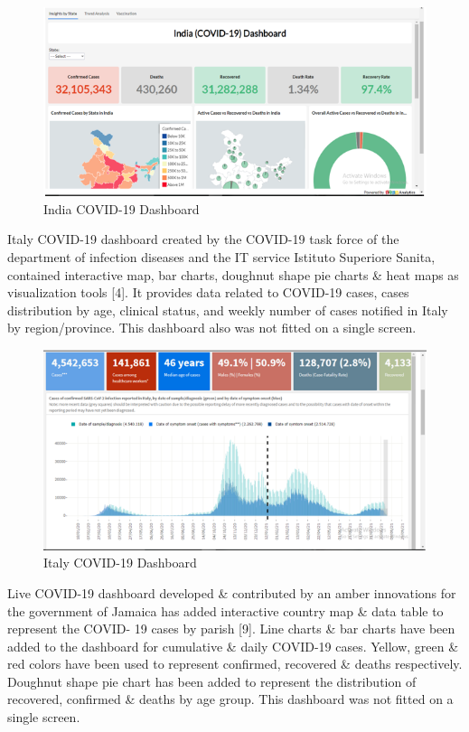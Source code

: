 \documentclass[
]{article}
\begin{document}
\begin{figure}
\includegraphics[width=8.42in]{Images/9} \caption{India COVID-19 Dashboard}\label{fig:unnamed-chunk-9}
\end{figure}

Italy COVID-19 dashboard created by the COVID-19 task force of the
department of infection diseases and the IT service Istituto Superiore
Sanita, contained interactive map, bar charts, doughnut shape pie charts
\& heat maps as visualization tools {[}4{]}. It provides data related to
COVID-19 cases, cases distribution by age, clinical status, and weekly
number of cases notified in Italy by region/province. This dashboard
also was not fitted on a single screen.

\begin{figure}
\includegraphics[width=8.12in]{Images/10} \caption{Italy COVID-19 Dashboard}\label{fig:unnamed-chunk-10}
\end{figure}

Live COVID-19 dashboard developed \& contributed by an amber innovations
for the government of Jamaica has added interactive country map \& data
table to represent the COVID- 19 cases by parish {[}9{]}. Line charts \&
bar charts have been added to the dashboard for cumulative \& daily
COVID-19 cases. Yellow, green \& red colors have been used to represent
confirmed, recovered \& deaths respectively. Doughnut shape pie chart
has been added to represent the distribution of recovered, confirmed \&
deaths by age group. This dashboard was not fitted on a single screen.
\end{document}
